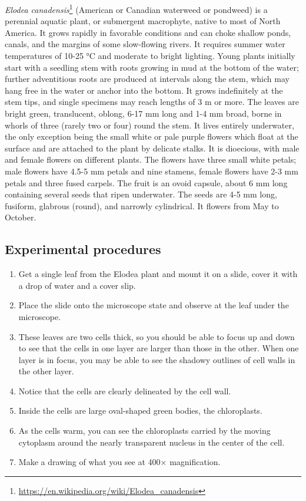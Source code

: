 \documentclass[]{book}
\providecommand{\tightlist}{%
  \setlength{\itemsep}{0pt}\setlength{\parskip}{0pt}}
\let\rmarkdownfootnote\footnote%
\def\footnote{\protect\rmarkdownfootnote}
\renewcommand{\href}[2]{#2\footnote{\url{#1}}}
\theoremstyle{definition}
\theoremstyle{definition}
\theoremstyle{definition}
\theoremstyle{remark}
\begin{document}
\href{https://en.wikipedia.org/wiki/Elodea_canadensis}{\emph{Elodea
canadensis}} (American or Canadian waterweed or pondweed) is a perennial
aquatic plant, or submergent macrophyte, native to most of North
America. It grows rapidly in favorable conditions and can choke shallow
ponds, canals, and the margins of some slow-flowing rivers. It requires
summer water temperatures of 10-25 °C and moderate to bright lighting.
Young plants initially start with a seedling stem with roots growing in
mud at the bottom of the water; further adventitious roots are produced
at intervals along the stem, which may hang free in the water or anchor
into the bottom. It grows indefinitely at the stem tips, and single
specimens may reach lengths of 3 m or more. The leaves are bright green,
translucent, oblong, 6-17 mm long and 1-4 mm broad, borne in whorls of
three (rarely two or four) round the stem. It lives entirely underwater,
the only exception being the small white or pale purple flowers which
float at the surface and are attached to the plant by delicate stalks.
It is dioecious, with male and female flowers on different plants. The
flowers have three small white petals; male flowers have 4.5-5 mm petals
and nine stamens, female flowers have 2-3 mm petals and three fused
carpels. The fruit is an ovoid capsule, about 6 mm long containing
several seeds that ripen underwater. The seeds are 4-5 mm long,
fusiform, glabrous (round), and narrowly cylindrical. It flowers from
May to October.

\subsection{Experimental procedures}\label{experimental-procedures}

\begin{enumerate}
\def\labelenumi{\arabic{enumi}.}
\tightlist
\item
  Get a single leaf from the Elodea plant and mount it on a slide, cover
  it with a drop of water and a cover slip.
\item
  Place the slide onto the microscope state and observe at the leaf
  under the microscope.
\item
  These leaves are two cells thick, so you should be able to focus up
  and down to see that the cells in one layer are larger than those in
  the other. When one layer is in focus, you may be able to see the
  shadowy outlines of cell walls in the other layer.
\item
  Notice that the cells are clearly delineated by the cell wall.
\item
  Inside the cells are large oval-shaped green bodies, the chloroplasts.
\item
  As the cells warm, you can see the chloroplasts carried by the moving
  cytoplasm around the nearly transparent nucleus in the center of the
  cell.
\item
  Make a drawing of what you see at 400× magnification.
\end{enumerate}
\end{document}
